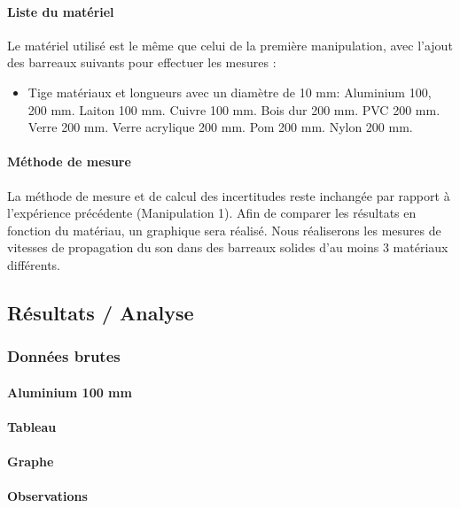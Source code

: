 \newpage

\paragraph{Liste du matériel}
Le matériel utilisé est le même que 
celui de la première manipulation, 
avec l'ajout des barreaux suivants pour 
effectuer les mesures :
\begin{itemize}
    \item Tige matériaux et longueurs avec un diamètre de 10 mm:
    \subitem Aluminium 100, 200 mm.
    \subitem Laiton 100 mm.
    \subitem Cuivre 100 mm.
    \subitem Bois dur 200 mm.
    \subitem PVC 200 mm.
    \subitem Verre 200 mm.
    \subitem Verre acrylique 200 mm.
    \subitem Pom 200 mm.
    \subitem Nylon 200 mm.
\end{itemize}
\paragraph{Méthode de mesure}
La méthode de mesure et de calcul des 
incertitudes reste inchangée par rapport 
à l'expérience précédente (Manipulation 1). 
Afin de comparer les résultats en fonction 
du matériau, un graphique sera réalisé. 
Nous réaliserons les mesures de vitesses de 
propagation du son dans des barreaux solides 
d'au moins 3 matériaux différents.

\newpage

\subsection{\large Résultats / Analyse}
\subsubsection{\large Données brutes}
\paragraph{\large Aluminium 100 mm}
\paragraph{Tableau}
\paragraph{Graphe}
\paragraph{Observations}

